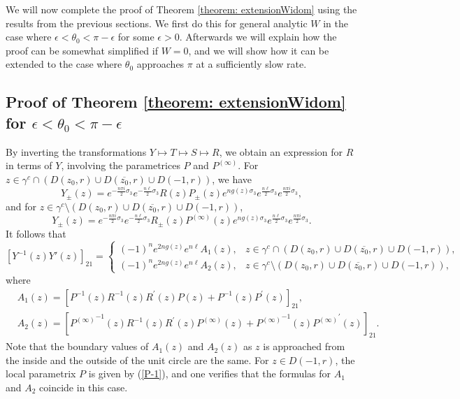 \documentclass[11pt,fleqn]{article}
\numberwithin{equation}{section}
\begin{document}
We will now complete the proof of Theorem \ref{theorem: extensionWidom} using the results from the previous sections. We first do this for general analytic $W$ in the case where $\epsilon<\theta_0<\pi-\epsilon$ for some $\epsilon>0$. Afterwards we will explain how the proof can be somewhat simplified if $W=0$, and we will show how it can be extended to the case where $\theta_0$ approaches $\pi$ at a sufficiently slow rate.



\subsection{Proof of Theorem \ref{theorem: extensionWidom} for $\epsilon<\theta_0<\pi-\epsilon$}

By inverting the transformations $Y\mapsto T\mapsto S\mapsto R$, we obtain an expression for $R$ in terms of $Y$, involving the parametrices $P$ and $P^{(\infty)}$.
For $z\in \gamma^c\cap (D(z_0,r)\cup D(\overline{z_0},r)\cup D(-1,r))$, we have
\begin{equation}\label{YinRin}
Y_\pm(z) = e^{-\frac{n\pi i}{2}\sigma_{3}}e^{-\frac{n\ell}{2}\sigma_3 } R(z) P_\pm(z) e^{ng(z)\sigma_3}e^{\frac{n\ell}{2} \sigma_{3}}e^{\frac{n\pi i}{2}\sigma_{3}},
\end{equation}
and for $z\in\gamma^c\setminus (D(z_0,r)\cup D(\overline{z_0},r)\cup D(-1,r))$,
\begin{equation}\label{YinR out}
Y_\pm(z) = e^{-\frac{n\pi i}{2}\sigma_{3}}e^{-\frac{n\ell}{2} \sigma_3} R_\pm(z) P^{(\infty)}(z) e^{ng(z)\sigma_3}e^{\frac{n\ell}{2} \sigma_{3}}e^{\frac{n\pi i}{2}\sigma_{3}}.
\end{equation}
It follows that
\begin{equation}\label{Yindiffid}
\left[Y^{-1}(z)Y'(z)\right]_{21}=\begin{cases} (-1)^{n}e^{2ng(z)}e^{n\ell}A_1(z),& z\in \gamma^c\cap (D(z_0,r)\cup D(\overline{z_0},r)\cup D(-1,r)),\\ (-1)^{n}e^{2ng(z)}e^{n\ell}A_2(z),&z\in\gamma^c\setminus (D(z_0,r)\cup D(\overline{z_0},r)\cup D(-1,r)),
\end{cases}
\end{equation}
where
\begin{align}
&A_{1}(z) = \left[ P^{-1}(z) R^{-1}(z) R^{\prime}(z) P(z) + P^{-1}(z)P^{\prime}(z) \right]_{21}, \\
&A_{2}(z) = \left[ {P^{(\infty )}}^{-1}(z) R^{-1}(z) R^{\prime}(z) P^{(\infty )}(z) + {P^{(\infty )}}^{-1}(z){P^{(\infty )}}^{\prime}(z) \right]_{21}.
\end{align}
Note that the boundary values of $A_1(z)$ and $A_2(z)$ as $z$ is approached from the inside and the outside of the unit circle are the same.
For $z\in D(-1,r)$, the local parametrix $P$ is given by (\ref{P-1}), and one verifies that the formulas for $A_1$ and $A_2$ coincide in this case.
\end{document}
